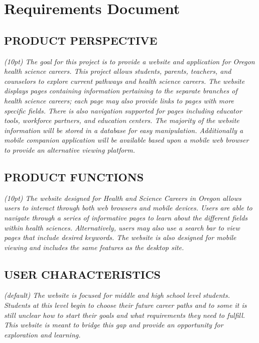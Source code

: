 \documentclass[letterpaper,10pt]{article}
\begin{document}
{%

\bigskip


\clearpage\section[Requirements Document]{\rmfamily\bfseries\color{black}
Requirements Document}


\subsection[PRODUCT
PERSPECTIVE]{\rmfamily\bfseries\color{black}
PRODUCT PERSPECTIVE}
{\itshape\color{black}\normalsize(10pt)
{The goal for this project is to provide a website and application for Oregon health science careers. This project allows students, parents, teachers, and counselors to explore current pathways and health science careers. The website displays pages containing information pertaining to the separate branches of health science careers; each page may also provide links to pages with more specific fields. There is also navigation supported for pages including educator tools, workforce partners, and education centers. The majority of the website information will be stored in a database for easy manipulation. Additionally a mobile companion application will be available based upon a mobile web browser to provide an alternative viewing platform.}



\subsection[PRODUCT
FUNCTIONS]{\rmfamily\bfseries\color{black}
PRODUCT FUNCTIONS}
{\itshape\color{black}\normalsize(10pt)
The website designed for Health and Science Careers in Oregon allows users to interact through both web browsers and mobile devices. Users are able to navigate through a series of informative pages to learn about the different fields within health sciences. Alternatively, users may also use a search bar to view pages that include desired keywords. The website is also designed for mobile viewing and includes the same features as the desktop site.}


\subsection[USER
CHARACTERISTICS]{\rmfamily\bfseries\color{black}
USER CHARACTERISTICS}
{\itshape\color{black}\normalsize(default)
The website is focused for middle and high school level students. Students at this level begin to choose their future career paths and to some it is still unclear how to start their goals and what requirements they need to fulfill. This website is meant to bridge this gap and provide an opportunity for exploration and learning. }

}}
\end{document}
